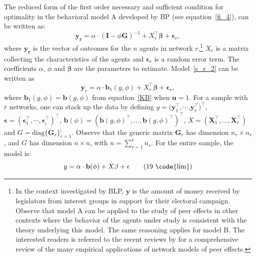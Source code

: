 \documentclass[nojss]{jss}
\begin{document}
The reduced form of the first order necessary and sufficient condition for optimality in the behavioral model A developed by BP (see equation~\ref{fi_4}), can be written as:
\begin{equation}
\mathbf{y}_{\mathbf{r}}=\alpha \cdot \left( \boldsymbol{I}-\phi \boldsymbol{G%
}\right) ^{-1}+X_{r}^\top\mathbf{\beta }+\mathbf{\epsilon }_{r},
\label{s_r_2}
\end{equation}
where $\mathbf{y}_{\mathbf{r}}$ is the vector of outcomes for the $n$ agents in network $r$,\footnote{In the context investigated by BLP, $\mathbf{y}$ is the amount of money received by legislators from interest groups in support for their electoral campaign. Observe that model A can be applied to the study of peer effects in other contexts where the behavior of the agents under study is consistent with the theory underlying this model. The same reasoning applies for model B. The interested readers is referred to the recent reviews by \cite{An:2011,An:2015a,Jackson+Rogers+Zenou:2017,Hsieh:2020,Zenou:2016} for a comprehensive review of the many empirical applications of network models of peer effects.} $X_{r}$ is a matrix collecting the characteristics of the agents and $\mathbf{\epsilon }_{r}$ is a random error term. The coefficients $\alpha $, $\phi $ and $\mathbf{\beta }$ are the parameters to estimate. Model~\ref{s_r_2} can be written as
\begin{equation}
\mathbf{y}_{r}=\alpha \cdot \boldsymbol{b}_{1}\left( g,\phi \right)
+X_{r}^\top\mathbf{\beta }+\mathbf{\epsilon }_{r},
\end{equation}%
where $\boldsymbol{b}_{1}\left(g,\phi \right) =\boldsymbol{b}\left(g,\phi
\right) $ from equation~\ref{KB} when $\boldsymbol{u}=1$.\newline
For a sample with $\bar{r}$ networks, one can stack up the data by defining $y=(\mathbf{y}_{1}^\top,\cdots$,$\mathbf{y}_{\bar{r}}^\top)^\top$, $\mathbf{\epsilon }=(\boldsymbol{\epsilon }_{1}^\top,\cdots ,\boldsymbol{\epsilon }_{_{\bar{r}}}^\top)^\top$, $\mathbf{b}(\phi)=\left(\boldsymbol{b}\left(g,\phi \right)^\top,...,\boldsymbol{b}\left(g,\phi\right)^\top\right) ^\top$, $X=(\boldsymbol{X}_{1}^\top,...,\boldsymbol{X}_{\overline{r}}^\top)$ and $G=\mathrm{diag}\{\boldsymbol{G}_{r}\}_{r=1}^{_{\bar{r}}}$. Observe that the generic matrix $\boldsymbol{G}_{r}$ has dimension $n_{r}\times n_{r}$, and $G$ has dimension $n\times n$, with $n=\sum_{r=1}^{\bar{r}} n_{r}$.
For the entire sample, the model is: 
\begin{equation}
y=\alpha \cdot \mathbf{b(}\phi \mathbf{)}+X\mathbf{\beta}+\mathbf{\epsilon } \tag{19 \code{lim}} \label{NLLS}
\end{equation}
\end{document}
